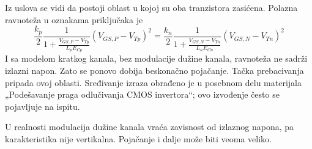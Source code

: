 Iz uslova se vidi da postoji oblast u kojoj su oba tranzistora zasićena. Polazna ravnoteža u oznakama priključaka je
\[\frac{k_p}2\frac1{1+\frac{V_{GS,P}-V_{Tp}}{L_pE_{Cp}}}(V_{GS,P}-V_{Tp})^2=\frac{k_n}2\frac1{1+\frac{V_{GS,N}-V_{Tn}}{L_nE_{Cn}}}(V_{GS,N}-V_{Tn})^2\]
I sa modelom kratkog kanala, bez modulacije dužine kanala, ravnoteža ne sadrži izlazni napon. Zato se ponovo dobija beskonačno pojačanje. Tačka prebacivanja pripada ovoj oblasti. Sređivanje izraza obrađeno je u posebnom delu materijala „Podešavanje praga odlučivanja CMOS invertora“; ovo izvođenje često se pojavljuje na ispitu.

U realnosti modulacija dužine kanala vraća zavisnost od izlaznog napona, pa karakteristika nije vertikalna. Pojačanje i dalje može biti veoma veliko.
